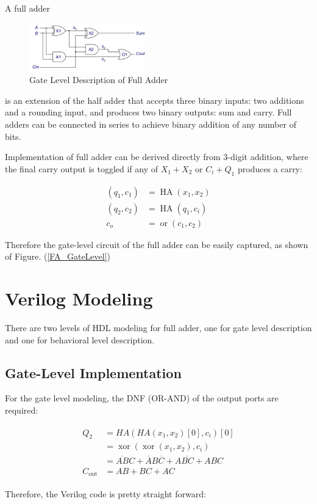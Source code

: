 \documentclass[conference]{IEEEtran}
\begin{document}
A full adder

\begin{figure}[htpb]
	\begin{center}
		\includegraphics[width=0.45\textwidth]{index.assets/20240303235337.png}
		\caption{Gate Level Description of Full Adder}
	\end{center}
\end{figure}\label{FA_GateLevel}

is an extension of the half adder that accepts three binary inputs: two additions and a rounding input, and produces two binary outputs: sum and carry. Full adders can be connected in series to achieve binary addition of any number of bits.

Implementation of full adder can be derived directly from 3-digit addition, where the final carry output is toggled if any of \(X_1+X_2\) or \(C_i+Q_1\) produces a carry:

\begin{eqnarray}
	(q_1,c_1)&=\mathop{\mathrm{HA}}(x_1,x_2) \\
	(q_2,c_2)&=\mathop{\mathrm{HA}}(q_1,c_i) \\
	c_o &= \mathop{\mathrm{or}}(c_1,c_2)
\end{eqnarray}

Therefore the gate-level circuit of the full adder can be easily captured, as shown of Figure. (\ref{FA_GateLevel})

\section{Verilog Modeling}

There are two levels of HDL modeling for full adder, one for gate level description and one for behavioral level description.

\subsection{Gate-Level Implementation}

For the gate level modeling, the DNF (OR-AND) of the output ports are required:

\begin{eqnarray}
\begin{aligned}
	Q_2&=HA(HA(x_1,x_2)[0],c_i)[0] \\
	&=\mathop{\mathrm{xor}}(\mathop{\mathrm{xor}}(x_1,x_2),c_i) \\
	&= \overline{AB} C+\overline{A} B \overline{C} + A \overline{BC} +ABC \\
	C_{\mathrm{out}}&=AB+BC+AC
\end{aligned}
\end{eqnarray}

Therefore, the Verilog code is pretty straight forward:


\end{document}

